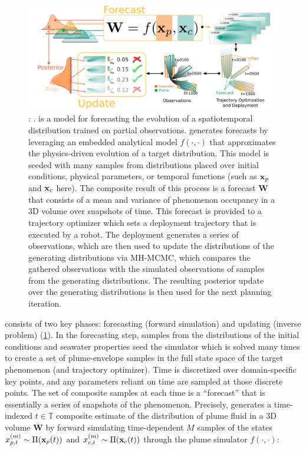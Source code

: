 \begin{figure}[h!]
    \centering
    \includegraphics[width=1\columnwidth]{figures/phumes_diagram.png}
    \caption[\PHUMES: \phumes]{\textbf{\PHUMES}: \phumes. \PHUMES is a model for forecasting the evolution of a spatiotemporal distribution trained on partial observations. \PHUMES generates forecasts by leveraging an embedded analytical model $f(\cdot, \cdot)$ that approximates the physics-driven evolution of a target distribution. This model is seeded with many samples from distributions placed over initial conditions, physical parameters, or temporal functions (such as $\mathbf{x}_p$ and $\mathbf{x}_c$ here). The composite result of this process is a forecast $\mathbf{W}$ that consists of a mean and variance of phenomenon occupancy in a 3D volume over snapshots of time. This forecast is provided to a trajectory optimizer which sets a deployment trajectory that is executed by a robot. The deployment generates a series of observations, which are then used to update the distributions of the generating distributions via MH-MCMC, which compares the gathered observations with the simulated observations of samples from the generating distributions. The resulting posterior update over the generating distributions is then used for the next planning iteration.}
    \label{fig:phumes}
\end{figure}

\PHUMES consists of two key phases: forecasting (forward simulation) and updating (inverse problem) (\cref{fig:phumes}). In the forecasting step, samples from the distributions of the initial conditions and seawater properties seed the simulator which is solved many times to create a set of plume-envelope samples in the full state space of the target phenomenon (and trajectory optimizer). Time is discretized over domain-specific key points, and any parameters reliant on time are sampled at those discrete points. The set of composite samples at each time is a ``forecast'' that is essentially a series of snapshots of the phenomenon. Precisely, \PHUMES generates a time-indexed $t \in \mathbb{T}$ composite estimate of the distribution of plume fluid in a 3D volume $\overbar{\mathbf{W}}$ by forward simulating time-dependent $M$ samples of the states $x_{p,t}^{(m)} \sim \Pi(\mathbf{x}_p(t))$ and $x_{c,t}^{(m)} \sim \Pi(\mathbf{x}_c(t))$ through the plume simulator $f(\cdot, \cdot)$:

